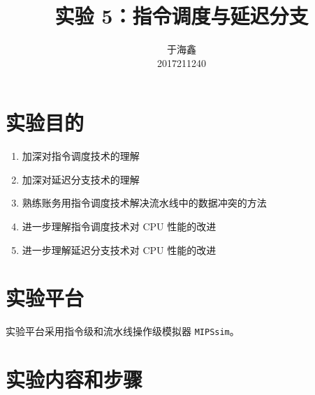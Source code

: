 \documentclass[blue,normal,cn]{elegantnote}
\title{实验 5：指令调度与延迟分支}
\date{\zhtoday}
\newcommand{\code}[1]{\colorbox{light-gray}{\texttt{#1}}}
\begin{document}
\author{
  \begin{tabular}[t]{c}
    于海鑫 \\
    2017211240
  \end{tabular}
}
\maketitle

\section{实验目的}
\begin{enumerate}
  \item 加深对指令调度技术的理解
  \item 加深对延迟分支技术的理解
  \item 熟练账务用指令调度技术解决流水线中的数据冲突的方法
  \item 进一步理解指令调度技术对 CPU 性能的改进
  \item 进一步理解延迟分支技术对 CPU 性能的改进
\end{enumerate}

\section{实验平台}

实验平台采用指令级和流水线操作级模拟器 \code{MIPSsim}。

\section{实验内容和步骤}
\end{document}
